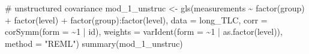 \documentclass[
  letterpaper,
  DIV=11,
  numbers=noendperiod]{scrreprt}
\newenvironment{Shaded}{\begin{snugshade}}{\end{snugshade}}
\newcommand{\AttributeTok}[1]{\textcolor[rgb]{0.40,0.45,0.13}{#1}}
\newcommand{\CommentTok}[1]{\textcolor[rgb]{0.37,0.37,0.37}{#1}}
\newcommand{\DecValTok}[1]{\textcolor[rgb]{0.68,0.00,0.00}{#1}}
\newcommand{\FunctionTok}[1]{\textcolor[rgb]{0.28,0.35,0.67}{#1}}
\newcommand{\NormalTok}[1]{\textcolor[rgb]{0.00,0.23,0.31}{#1}}
\newcommand{\OtherTok}[1]{\textcolor[rgb]{0.00,0.23,0.31}{#1}}
\newcommand{\SpecialCharTok}[1]{\textcolor[rgb]{0.37,0.37,0.37}{#1}}
\newcommand{\StringTok}[1]{\textcolor[rgb]{0.13,0.47,0.30}{#1}}
\begin{document}
\begin{Shaded}
\begin{Highlighting}[]
\CommentTok{\# unstructured covariance}
\NormalTok{mod\_1\_unstruc }\OtherTok{\textless{}{-}} \FunctionTok{gls}\NormalTok{(measurements }\SpecialCharTok{\textasciitilde{}} \FunctionTok{factor}\NormalTok{(group) }\SpecialCharTok{+} \FunctionTok{factor}\NormalTok{(level) }\SpecialCharTok{+} \FunctionTok{factor}\NormalTok{(group)}\SpecialCharTok{:}\FunctionTok{factor}\NormalTok{(level),}
    \AttributeTok{data =}\NormalTok{ long\_TLC, }\AttributeTok{corr =} \FunctionTok{corSymm}\NormalTok{(}\AttributeTok{form =} \SpecialCharTok{\textasciitilde{}}\DecValTok{1} \SpecialCharTok{|}\NormalTok{ id), }\AttributeTok{weights =} \FunctionTok{varIdent}\NormalTok{(}\AttributeTok{form =} \SpecialCharTok{\textasciitilde{}}\DecValTok{1} \SpecialCharTok{|}
        \FunctionTok{as.factor}\NormalTok{(level)), }\AttributeTok{method =} \StringTok{"REML"}\NormalTok{)}
\FunctionTok{summary}\NormalTok{(mod\_1\_unstruc)}
\end{Highlighting}
\end{Shaded}
\end{document}
